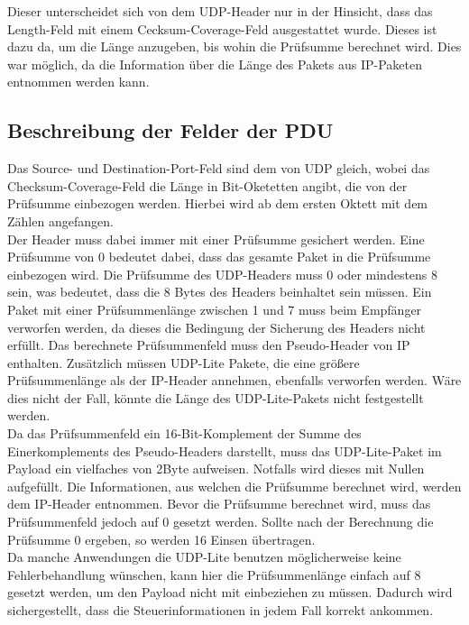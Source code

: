 \documentclass{template}
\begin{document}
Dieser unterscheidet sich von dem UDP-Header nur in der Hinsicht, dass
das Length-Feld mit einem Cecksum-Coverage-Feld ausgestattet wurde.
Dieses ist dazu da, um die Länge anzugeben, bis wohin die Prüfsumme
berechnet wird. Dies war möglich, da die Information über die Länge
des Pakets aus IP-Paketen entnommen werden kann.\\

\subsection{Beschreibung der Felder der PDU}

Das Source- und Destination-Port-Feld sind dem von UDP gleich, wobei
das Checksum-Coverage-Feld die Länge in Bit-Oketetten angibt, die von
der Prüfsumme einbezogen werden. Hierbei wird ab dem ersten Oktett
mit dem Zählen angefangen.\\

Der Header muss dabei immer mit einer Prüfsumme gesichert werden.
Eine Prüfsumme von 0 bedeutet dabei, dass das gesamte Paket in die
Prüfsumme einbezogen wird. Die Prüfsumme des UDP-Headers muss 0 oder
mindestens 8 sein, was bedeutet, dass die 8 Bytes des Headers beinhaltet
sein müssen. Ein Paket mit einer Prüfsummenlänge zwischen 1 und 7 muss
beim Empfänger verworfen werden, da dieses die Bedingung der Sicherung des Headers nicht erfüllt.
Das berechnete Prüfsummenfeld muss den Pseudo-Header von IP enthalten.
Zusätzlich müssen UDP-Lite Pakete, die eine größere Prüfsummenlänge als
der IP-Header annehmen, ebenfalls verworfen werden. Wäre dies nicht der Fall,
könnte die Länge des UDP-Lite-Pakets nicht festgestellt werden.\\

Da das Prüfsummenfeld ein 16-Bit-Komplement der Summe
des Einerkomplements des Pseudo-Headers darstellt, muss das UDP-Lite-Paket
im Payload ein vielfaches von 2Byte aufweisen. Notfalls wird dieses mit
Nullen aufgefüllt. Die Informationen, aus welchen die Prüfsumme berechnet
wird, werden dem IP-Header entnommen. Bevor die Prüfsumme berechnet wird,
muss das Prüfsummenfeld jedoch auf 0 gesetzt werden. Sollte nach der
Berechnung die Prüfsumme 0 ergeben, so werden 16 Einsen übertragen.\\

Da manche Anwendungen die UDP-Lite benutzen möglicherweise keine
Fehlerbehandlung wünschen, kann hier die Prüfsummenlänge einfach
auf 8 gesetzt werden, um den Payload nicht mit einbeziehen zu müssen.
Dadurch wird sichergestellt, dass die Steuerinformationen in jedem
Fall korrekt ankommen.\\
\end{document}
